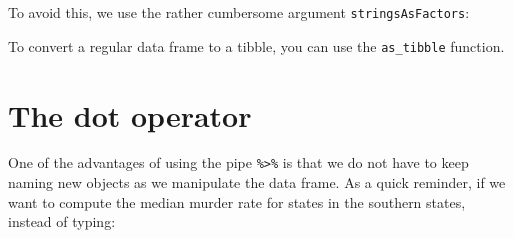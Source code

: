 \documentclass[
]{krantz}
\newenvironment{Shaded}{\begin{snugshade}}{\end{snugshade}}
\newcommand{\CommentTok}[1]{\textcolor[rgb]{0.37,0.37,0.37}{\textit{#1}}}
\newcommand{\DataTypeTok}[1]{\textcolor[rgb]{0.27,0.27,0.27}{#1}}
\newcommand{\DecValTok}[1]{\textcolor[rgb]{0.06,0.06,0.06}{#1}}
\newcommand{\KeywordTok}[1]{\textcolor[rgb]{0.27,0.27,0.27}{\textbf{#1}}}
\newcommand{\NormalTok}[1]{#1}
\newcommand{\OperatorTok}[1]{\textcolor[rgb]{0.43,0.43,0.43}{\textbf{#1}}}
\newcommand{\OtherTok}[1]{\textcolor[rgb]{0.37,0.37,0.37}{#1}}
\newcommand{\StringTok}[1]{\textcolor[rgb]{0.5,0.5,0.5}{#1}}
\begin{document}
To avoid this, we use the rather cumbersome argument \texttt{stringsAsFactors}:

\begin{Shaded}
\end{Shaded}

To convert a regular data frame to a tibble, you can use the \texttt{as\_tibble} function.

\begin{Shaded}
\end{Shaded}

\hypertarget{the-dot-operator}{%
\section{The dot operator}\label{the-dot-operator}}

One of the advantages of using the pipe \texttt{\%\textgreater{}\%} is that we do not have to keep naming new objects as we manipulate the data frame. As a quick reminder, if we want to compute the median murder rate for states in the southern states, instead of typing:

\begin{Shaded}
\end{Shaded}
\end{document}
